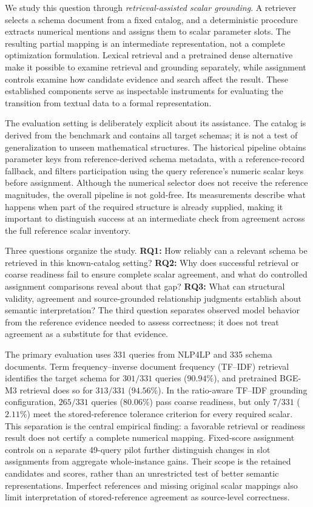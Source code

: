 \documentclass[pdflatex,iicol,sn-basic,Numbered]{sn-jnl}
\begin{document}
We study this question through \emph{retrieval-assisted scalar grounding}. A retriever selects a schema document from a fixed catalog, and a deterministic procedure extracts numerical mentions and assigns them to scalar parameter slots. The resulting partial mapping is an intermediate representation, not a complete optimization formulation. Lexical retrieval and a pretrained dense alternative make it possible to examine retrieval and grounding separately, while assignment controls examine how candidate evidence and search affect the result. These established components serve as inspectable instruments for evaluating the transition from textual data to a formal representation.

The evaluation setting is deliberately explicit about its assistance. The catalog is derived from the benchmark and contains all target schemas; it is not a test of generalization to unseen mathematical structures. The historical pipeline obtains parameter keys from reference-derived schema metadata, with a reference-record fallback, and filters participation using the query reference's numeric scalar keys before assignment. Although the numerical selector does not receive the reference magnitudes, the overall pipeline is not gold-free. Its measurements describe what happens when part of the required structure is already supplied, making it important to distinguish success at an intermediate check from agreement across the full reference scalar inventory.

Three questions organize the study. \textbf{RQ1:} How reliably can a relevant schema be retrieved in this known-catalog setting? \textbf{RQ2:} Why does successful retrieval or coarse readiness fail to ensure complete scalar agreement, and what do controlled assignment comparisons reveal about that gap? \textbf{RQ3:} What can structural validity, agreement and source-grounded relationship judgments establish about semantic interpretation? The third question separates observed model behavior from the reference evidence needed to assess correctness; it does not treat agreement as a substitute for that evidence.

The primary evaluation uses 331 queries from \textsc{NLP4LP} \cite{nlp4lp_dataset} and 335 schema documents. Term frequency--inverse document frequency (TF--IDF) retrieval identifies the target schema for $301/331$ queries ($90.94\%$), and pretrained BGE-M3 retrieval does so for $313/331$ ($94.56\%$). In the ratio-aware TF--IDF grounding configuration, $265/331$ queries ($80.06\%$) pass coarse readiness, but only $7/331$ ($2.11\%$) meet the stored-reference tolerance criterion for every required scalar. This separation is the central empirical finding: a favorable retrieval or readiness result does not certify a complete numerical mapping. Fixed-score assignment controls on a separate 49-query pilot further distinguish changes in slot assignments from aggregate whole-instance gains. Their scope is the retained candidates and scores, rather than an unrestricted test of better semantic representations. Imperfect references and missing original scalar mappings also limit interpretation of stored-reference agreement as source-level correctness.
\end{document}
